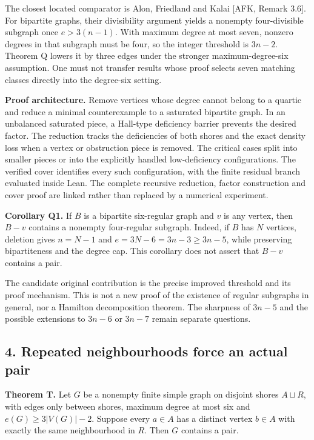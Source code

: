 \documentclass[
  11pt,
]{article}
\newcounter{none} %
\begin{document}
The closest located comparator is Alon, Friedland and Kalai {[}AFK,
Remark 3.6{]}. For bipartite graphs, their divisibility argument yields
a nonempty four-divisible subgraph once \(e>3(n-1)\). With maximum
degree at most seven, nonzero degrees in that subgraph must be four, so
the integer threshold is \(3n-2\). Theorem Q lowers it by three edges
under the stronger maximum-degree-six assumption. One must not transfer
results whose proof selects seven matching classes directly into the
degree-six setting.

\textbf{Proof architecture.} Remove vertices whose degree cannot belong
to a quartic and reduce a minimal counterexample to a saturated
bipartite graph. In an unbalanced saturated piece, a Hall-type
deficiency barrier prevents the desired factor. The reduction tracks the
deficiencies of both shores and the exact density loss when a vertex or
obstruction piece is removed. The critical cases split into smaller
pieces or into the explicitly handled low-deficiency configurations. The
verified cover identifies every such configuration, with the finite
residual branch evaluated inside Lean. The complete recursive reduction,
factor construction and cover proof are linked rather than replaced by a
numerical experiment.

\textbf{Corollary Q1.} If \(B\) is a bipartite six-regular graph and
\(v\) is any vertex, then \(B-v\) contains a nonempty four-regular
subgraph. Indeed, if \(B\) has \(N\) vertices, deletion gives \(n=N-1\)
and \(e=3N-6=3n-3\geq3n-5\), while preserving bipartiteness and the
degree cap. This corollary does not assert that \(B-v\) contains a pair.

The candidate original contribution is the precise improved threshold
and its proof mechanism. This is not a new proof of the existence of
regular subgraphs in general, nor a Hamilton decomposition theorem. The
sharpness of \(3n-5\) and the possible extensions to \(3n-6\) or
\(3n-7\) remain separate questions.

\subsection{4. Repeated neighbourhoods force an actual
pair}\label{repeated-neighbourhoods-force-an-actual-pair}

\textbf{Theorem T.} Let \(G\) be a nonempty finite simple graph on
disjoint shores \(A\sqcup R\), with edges only between shores, maximum
degree at most six and \(e(G)\geq3|V(G)|-2\). Suppose every \(a\in A\)
has a distinct vertex \(b\in A\) with exactly the same neighbourhood in
\(R\). Then \(G\) contains a pair.
\end{document}
